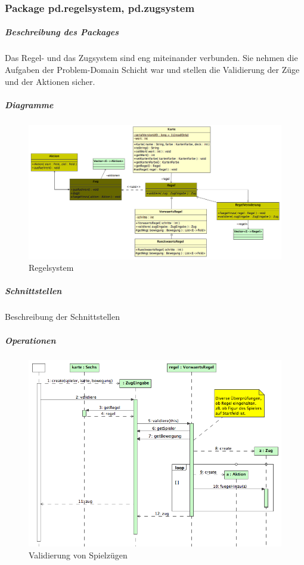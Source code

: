 \documentclass[a4paper,12pt,halfparskip,DIV14]{scrartcl}
\begin{document}
\subsubsection{Package pd.regelsystem, pd.zugsystem} %
\label{ssub:package_pd_regelsystem}
\subparagraph{Beschreibung des Packages} %
\label{ssub:beschreibung_des_packages}
Das Regel- und das Zugsystem sind eng miteinander verbunden. Sie nehmen die Aufgaben der Problem-Domain Schicht war und stellen die Validierung der Züge und der Aktionen sicher.
\subparagraph{Diagramme} %
\label{ssub:diagramme}
\begin{figure}
	[htp] \centering 
	\includegraphics[width=1\textwidth]{pd_regelsystem.png} \caption{Regelsystem}\label{fig:pd_regelsystem.png} 
\end{figure}
\subparagraph{Schnittstellen} %
\label{ssub:schnittstellen}
Beschreibung der Schnittstellen
\subparagraph{Operationen} %
\label{ssub:operationen}
\begin{figure}
	[htp] \centering 
	\includegraphics[width=1\textwidth]{pd_validierung.png} \caption{Validierung von Spielzügen}\label{fig:pd_validierung.png} 
\end{figure}
\end{document}
